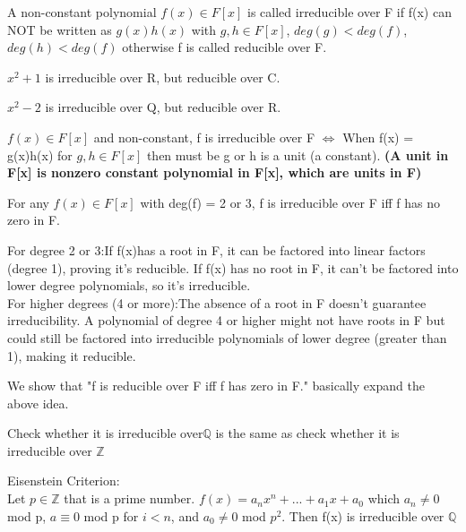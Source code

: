 \documentclass{article}
\newcommand\Z{\ensuremath{\mathbb{Z}}}
\newcommand\Q{\ensuremath{\mathbb{Q}}}
\begin{document}
\begin{Def}
    A non-constant polynomial $f(x) \in F[x]$ is called irreducible over F if f(x) can NOT be written as $g(x)h(x)$ with $g, h \in F[x]$, $deg(g) < deg(f)$, $deg(h) < deg(f)$ otherwise f is called reducible over F. 
\end{Def}
\begin{Example}
    $x^2+1 $ is irreducible over R, but reducible over C.
\end{Example}
\begin{Example}
    $x^2-2$ is irreducible over Q, but reducible over R. 
\end{Example}
\begin{note}
    $f(x) \in F[x]$ and non-constant, f is irreducible over F $\Leftrightarrow$ When f(x) = g(x)h(x) for $g, h \in F[x]$ then must be g or h is a unit (a constant).\textbf{ (A unit in F[x] is nonzero constant polynomial in F[x], which are units in F)}
    
\end{note}

\begin{theorem}
    For any $f(x) \in F[x]$ with deg(f) = 2 or 3, f is irreducible over F iff f has no zero in F. 
\end{theorem}
\begin{note}
For degree 2 or 3:If f(x)has a root in F, it can be factored into linear factors (degree 1), proving it's reducible. If f(x) has no root in 
F, it can't be factored into lower degree polynomials, so it's irreducible.
\\For higher degrees (4 or more):The absence of a root in F doesn't guarantee irreducibility. A polynomial of degree 4 or higher might not have roots in F but could still be factored into irreducible polynomials of lower degree (greater than 1), making it reducible.
\end{note}
\begin{Proof}
    We show that "f is reducible over F iff f has zero in F."
   basically expand the above idea. 
\end{Proof}

\begin{theorem}
    Check whether it is irreducible over$\Q$ is the same as check whether it is irreducible over $\Z$
\end{theorem}

\begin{theorem}
    Eisenstein Criterion:
\\ Let $p \in \Z$ that is a prime number. $f(x) = a_nx^n + ...+a_1x + a_0$ which $a_n \neq 0$ mod p, $a \equiv 0$ mod p for $i<n$, and $a_0 \neq 0$ mod $p^2$. Then f(x) is irreducible over $\Q$

\end{theorem}
\end{document}
